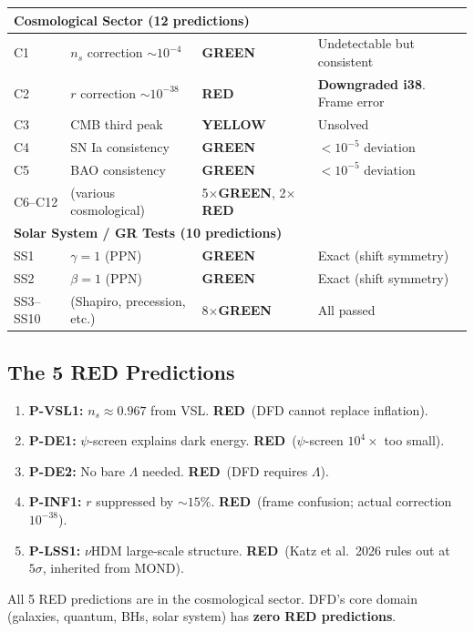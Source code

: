 \documentclass[11pt,a4paper]{article}
\newcommand{\GREEN}{\textcolor{dfdgreen}{\textbf{GREEN}}}
\newcommand{\YELLOW}{\textcolor{dfdyellow}{\textbf{YELLOW}}}
\newcommand{\RED}{\textcolor{dfdred}{\textbf{RED}}}
\begin{document}
\begin{center}
\begin{longtable}{p{1cm}p{6cm}p{1.5cm}p{4cm}}
\midrule
\multicolumn{4}{l}{\textbf{Cosmological Sector (12 predictions)}} \\
\midrule
C1 & $n_s$ correction $\sim 10^{-4}$ & \GREEN & Undetectable but consistent \\
C2 & $r$ correction $\sim 10^{-38}$ & \RED & \textbf{Downgraded i38}. Frame error \\
C3 & CMB third peak & \YELLOW & Unsolved \\
C4 & SN Ia consistency & \GREEN & $< 10^{-5}$ deviation \\
C5 & BAO consistency & \GREEN & $< 10^{-5}$ deviation \\
C6--C12 & (various cosmological) & 5$\times$\GREEN, 2$\times$\RED & \\
\midrule
\multicolumn{4}{l}{\textbf{Solar System / GR Tests (10 predictions)}} \\
\midrule
SS1 & $\gamma = 1$ (PPN) & \GREEN & Exact (shift symmetry) \\
SS2 & $\beta = 1$ (PPN) & \GREEN & Exact (shift symmetry) \\
SS3--SS10 & (Shapiro, precession, etc.) & 8$\times$\GREEN & All passed \\
\bottomrule
\end{longtable}
\end{center}

\subsection{The 5 RED Predictions}

\begin{enumerate}
\item \textbf{P-VSL1:} $n_s \approx 0.967$ from VSL. \RED\ (DFD cannot replace inflation).
\item \textbf{P-DE1:} $\psi$-screen explains dark energy. \RED\ ($\psi$-screen $10^4\times$ too small).
\item \textbf{P-DE2:} No bare $\Lambda$ needed. \RED\ (DFD requires $\Lambda$).
\item \textbf{P-INF1:} $r$ suppressed by $\sim 15\%$. \RED\ (frame confusion; actual correction $10^{-38}$).
\item \textbf{P-LSS1:} $\nu$HDM large-scale structure. \RED\ (Katz et al.\ 2026 rules out at $5\sigma$, inherited from MOND).
\end{enumerate}

All 5 RED predictions are in the cosmological sector. DFD's core domain (galaxies, quantum, BHs, solar system) has \textbf{zero RED predictions}.
\end{document}
